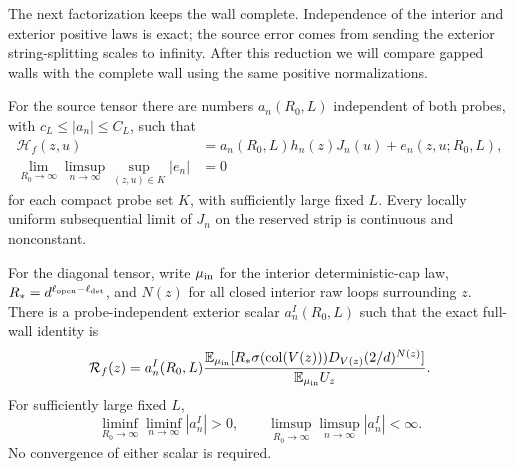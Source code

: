 The next factorization keeps the wall complete.  Independence of the
interior and exterior positive laws is exact; the source error comes
from sending the exterior string-splitting scales to infinity.
After this reduction we will compare gapped walls with the complete
wall using the same positive normalizations.

\begin{proposition}
\label{prop:obs-factorization}
For the source tensor there are numbers $a_n(R_0,L)$ independent
of both probes, with $c_L\le|a_n|\le C_L$, such that
\begin{equation}
 \begin{aligned}
 \mathcal H_f(z,u)&=a_n(R_0,L)h_n(z)J_n(u)+e_n(z,u;R_0,L),\\
 \lim_{R_0\to\infty}\limsup_{n\to\infty}
       \sup_{(z,u)\in K}|e_n|&=0
 \end{aligned}
 \label{obs:source-factorization}
\end{equation}
for each compact probe set $K$, with sufficiently large fixed $L$.
Every locally uniform subsequential limit of $J_n$ on the reserved
strip is continuous and nonconstant.

For the diagonal tensor, write $\mu_{\rm in}$ for the interior
deterministic-cap law, $R_*=d^{\ell_{\rm open}-\ell_{\rm det}}$,
and $N(z)$ for all closed interior raw loops surrounding $z$.
There is a probe-independent exterior scalar $a_n^I(R_0,L)$ such
that the exact full-wall identity is
\begin{equation}
 \mathcal R_f(z)=a_n^I(R_0,L)
 \frac{\mathbb E_{\mu_{\rm in}}
   [R_*\sigma(\operatorname{col}(V(z)))D_{V(z)}(2/d)^{N(z)}]}
 {\mathbb E_{\mu_{\rm in}}U_z}.
 \label{obs:diagonal-factorization}
\end{equation}
For sufficiently large fixed $L$,
\begin{equation}
 \liminf_{R_0\to\infty}\liminf_{n\to\infty}|a_n^I|>0,
 \qquad \limsup_{R_0\to\infty}\limsup_{n\to\infty}|a_n^I|<\infty.
 \label{obs:diagonal-exterior-nonzero}
\end{equation}
No convergence of either scalar is required.
\end{proposition}

